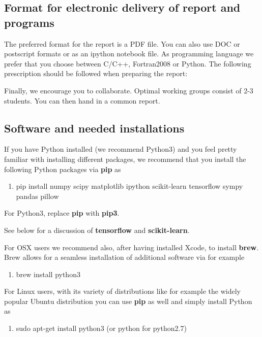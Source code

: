 \documentclass[%
oneside,                 %
final,                   %
10pt]{article}
\begin{document}
\noindent
\subsection{Format for electronic delivery of report and programs}

The preferred format for the report is a PDF file. You can also use DOC or postscript formats or as an ipython notebook file.  As programming language we prefer that you choose between C/C++, Fortran2008 or Python. The following prescription should be followed when preparing the report:


Finally, 
we encourage you to collaborate. Optimal working groups consist of 
2-3 students. You can then hand in a common report. 



\subsection{Software and needed installations}

If you have Python installed (we recommend Python3) and you feel pretty familiar with installing different packages, 
we recommend that you install the following Python packages via \textbf{pip} as
\begin{enumerate}
\item pip install numpy scipy matplotlib ipython scikit-learn tensorflow sympy pandas pillow
\end{enumerate}

\noindent
For Python3, replace \textbf{pip} with \textbf{pip3}.

See below for a discussion of \textbf{tensorflow} and \textbf{scikit-learn}. 

For OSX users we recommend also, after having installed Xcode, to install \textbf{brew}. Brew allows 
for a seamless installation of additional software via for example
\begin{enumerate}
\item brew install python3
\end{enumerate}

\noindent
For Linux users, with its variety of distributions like for example the widely popular Ubuntu distribution
you can use \textbf{pip} as well and simply install Python as 
\begin{enumerate}
\item sudo apt-get install python3  (or python for python2.7)
\end{enumerate}
\end{document}
